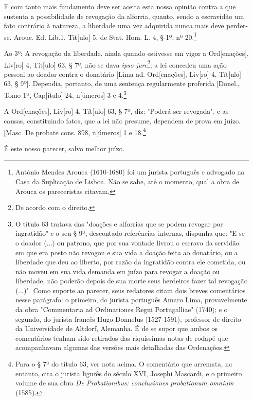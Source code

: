 E com tanto mais fundamento deve ser aceita esta nossa opinião contra a
que sustenta a possibilidade de revogação da alforria, quanto, sendo a
escravidão um fato contrário à natureza, a liberdade uma vez adquirida
nunca mais deve perder-se. Arouc. Ed. Lib.1, Tit{[}ulo{]} 5, de Stat.
Hom. L. 4, § 1º, nº 20.\footnote{António Mendes Arouca (1610-1680) foi
  um jurista português e advogado na Casa da Suplicação de Lisboa. Não
  se sabe, até o momento, qual a obra de Arouca os pareceristas citavam.}

Ao 3º: A revogação da liberdade, ainda quando estivesse em vigor a
Ord{[}enações{]}, Liv{[}ro{]} 4, Tít{[}ulo{]} 63, § 7º, não se dava
\emph{ipso jure}\footnote{De acordo com o direito.}; a lei concedeu
uma ação pessoal ao doador contra o donatário {[}Lima ad.
Ord{[}enações{]}, Liv{[}ro{]} 4, Tít{[}ulo{]} 63, § 9º{]}. Dependia,
portanto, de uma sentença regularmente proferida {[}Donel., Tomo 1º,
Cap{[}ítulo{]} 24, n{[}úmeros{]} 3 e 4.\footnote{O título 63 tratava
  das "doações e alforrias que se podem revogar por ingratidão" e o seu
  § 9º, descontado referências internas, dispunha que: "E se o doador
  (...) ou patrono, que por sua vontade livrou o escravo da servidão em
  que era posto não revogou e sua vida a doação feita ao donatário, ou a
  liberdade que deu ao liberto, por razão da ingratidão contra ele
  cometida, ou não moveu em sua vida demanda em juízo para revogar a
  doação ou liberdade, não poderão depois de sua morte seus herdeiros
  fazer tal revogação (...)". Como suporte ao parecer, seus redatores
  citam dois breves comentários nesse parágrafo: o primeiro, do jurista
  português Amaro Lima, provavelmente da obra "Commentaria ad
  Ordinationes Regni Portugalliae" (1740); e o segundo, do jurista
  francês Hugo Donnelus (1527-1591), professor de direito da
  Universidade de Altdorf, Alemanha. É de se supor que ambos os
  comentários tenham sido retirados das riquíssimas notas de rodapé que
  acompanhavam algumas das versões mais detalhadas das Ordenações.}

A Ord{[}enações{]}, Liv{[}ro{]} 4, Tít{[}ulo{]} 63, § 7º, diz: "Poderá
ser revogada", e as causas, constituindo fatos, que a lei não presume,
dependem de prova em juízo. {[}Masc. De probate cons. 898, n{[}úmeros{]}
1 e 18.\footnote{Para o § 7º do título 63, ver nota acima. O
  comentário que arremata, no entanto, cita o jurista ligurês do século
  XVI, Josephi Mascardi, e o primeiro volume de sua obra \emph{De
  Probationibus: conclusiones probationum omnium} (1585).}

É este nosso parecer, salvo melhor juízo.

